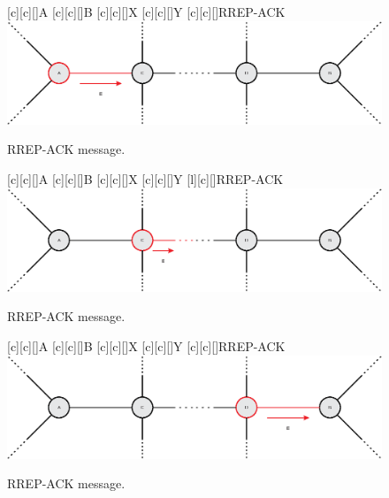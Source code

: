 \documentclass[mathserif]{beamer}
\begin{document}
\begin{frame}
\begin{overprint}
{\begin{figure}[ht]
				[c][c][\sizeLetter]{A}
				[c][c][\sizeLetter]{B}
				[c][c][\sizeLetter]{X}
				[c][c][\sizeLetter]{Y}
				[c][c][\sizeLetter]{\alert{RREP-ACK}}
				\centering
				\includegraphics[width=\linewidth]{figuras/routing7}
				\caption{RREP-ACK message.}
			\end{figure}
		}
		{
			\begin{figure}[ht]
				[c][c][\sizeLetter]{A}
				[c][c][\sizeLetter]{B}
				[c][c][\sizeLetter]{X}
				[c][c][\sizeLetter]{Y}
				[l][c][\sizeLetter]{\alert{RREP-ACK}}
				\centering
				\includegraphics[width=\linewidth]{figuras/routing8}
				\caption{RREP-ACK message.}
			\end{figure}
		}
		{
			\begin{figure}[ht]
				[c][c][\sizeLetter]{A}
				[c][c][\sizeLetter]{B}
				[c][c][\sizeLetter]{X}
				[c][c][\sizeLetter]{Y}
				[c][c][\sizeLetter]{\alert{RREP-ACK}}
				\centering
				\includegraphics[width=\linewidth]{figuras/routing9}
				\caption{RREP-ACK message.}
			\end{figure}
		}
	\end{overprint}
\end{frame}
\end{document}
